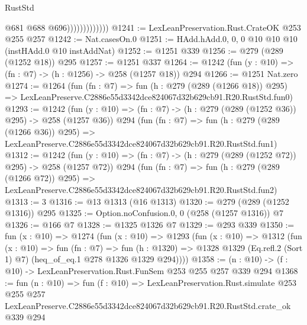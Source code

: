 \begin{lexlean}{RustStd}
\begin{coremodule}
                              @681
                              @688
                              @696)))))))))))))
@1241 := LexLeanPreservation.Rust.CrateOK @253 @255 @257
@1242 := Nat.casesOn.{0}
@1251 := HAdd.hAdd.{0, 0, 0} @10 @10 @10 (instHAdd.{0} @10 instAddNat)
@1252 := @1251 @339
@1256 := @279 (@289 (@1252 @18)) @295
@1257 := @1251 @337
@1264 := @1242 (fun (y : @10) => (fn : @7) -> (h : @1256) -> @258 (@1257 @18)) @294
@1266 := @1251 Nat.zero
@1274 := @1264
    (fun (fn : @7) =>
    fun (h : @279 (@289 (@1266 @18)) @295) =>
    LexLeanPreserve.C2886e55d3342dce824067d32b629cb91.R20.RustStd.fun0)
@1293 := @1242
    (fun (y : @10) => (fn : @7) -> (h : @279 (@289 (@1252 @36)) @295) -> @258 (@1257 @36))
    @294
    (fun (fn : @7) =>
    fun (h : @279 (@289 (@1266 @36)) @295) =>
    LexLeanPreserve.C2886e55d3342dce824067d32b629cb91.R20.RustStd.fun1)
@1312 := @1242
    (fun (y : @10) => (fn : @7) -> (h : @279 (@289 (@1252 @72)) @295) -> @258 (@1257 @72))
    @294
    (fun (fn : @7) =>
    fun (h : @279 (@289 (@1266 @72)) @295) =>
    LexLeanPreserve.C2886e55d3342dce824067d32b629cb91.R20.RustStd.fun2)
@1313 := 3
@1316 := @13 @1313 (@16 @1313)
@1320 := @279 (@289 (@1252 @1316)) @295
@1325 := Option.noConfusion.{0, 0} (@258 (@1257 @1316)) @7
@1326 := @166 @7
@1328 := @1325 @1326 @7
@1329 := @293 @339
@1350 := fun (x : @10) =>
  @1274
    (fun (x : @10) =>
    @1293
      (fun (x : @10) =>
      @1312
        (fun (x : @10) =>
        fun (fn : @7) =>
        fun (h : @1320) =>
        @1328 @1329 (Eq.refl.{2} (Sort 1) @7) (heq_of_eq.{1} @278 @1326 @1329 @294))))
@1358 := (n : @10) -> (f : @10) -> LexLeanPreservation.Rust.FunSem @253 @255 @257 @339 @294
@1368 := fun (n : @10) =>
  fun (f : @10) =>
  LexLeanPreservation.Rust.simulate
    @253
    @255
    @257
    LexLeanPreserve.C2886e55d3342dce824067d32b629cb91.R20.RustStd.crate_ok
    @339
    @294
\end{coremodule}
\end{lexlean}
